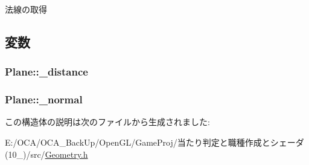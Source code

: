 法線の取得 



\subsection{変数}
\hypertarget{struct_plane_a0e8b30b00f8e086dee3750e7924dfb63}{
\subsubsection[{\-\_\-distance}]{ Plane\-::\-\_\-distance}}\label{struct_plane_a0e8b30b00f8e086dee3750e7924dfb63}
\hypertarget{struct_plane_a066d3194f5778ba03d9d92a11db18e3b}{
\subsubsection[{\-\_\-normal}]{ Plane\-::\-\_\-normal}}\label{struct_plane_a066d3194f5778ba03d9d92a11db18e3b}


この構造体の説明は次のファイルから生成されました\-:\begin{DoxyCompactItemize}
\item 
E\-:/\-O\-C\-A/\-O\-C\-A\-\_\-\-Back\-Up/\-Open\-G\-L/\-Game\-Proj/当たり判定と職種作成とシェーダ(10\-\_)/src/\hyperlink{_geometry_8h}{Geometry.\-h}\end{DoxyCompactItemize}
